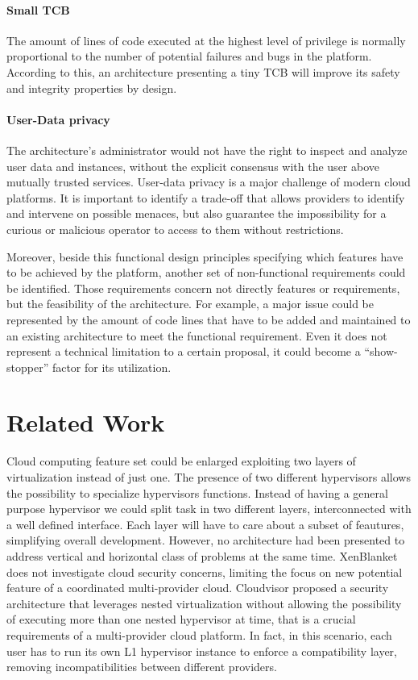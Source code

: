 \documentclass{acm_proc_article-sp} %
\begin{document}
\paragraph{Small TCB} The amount of lines of code executed at the highest level of privilege is normally proportional to the number of potential failures and bugs in the platform. According to this, an architecture presenting a tiny TCB will improve its safety and integrity properties by design.
\paragraph{User-Data privacy} The architecture's administrator would not have the right to inspect and analyze user data and instances, without the explicit consensus with the user above mutually trusted services. User-data privacy is a major challenge of modern cloud platforms. It is important to identify a trade-off that allows providers to identify and intervene on possible menaces, but also guarantee the impossibility for a curious or malicious operator to access to them without restrictions.

Moreover, beside this functional design principles specifying which features have to be achieved by the platform, another set of non-functional requirements could be identified. Those requirements concern not directly features or requirements, but the feasibility of the architecture. For example, a major issue could be represented by the amount of code lines that have to be added and maintained to an existing architecture to meet the functional requirement. Even it does not represent a technical limitation to a certain proposal, it could become a ``show-stopper'' factor for its utilization.


\section{Related Work}
Cloud computing feature set could be enlarged exploiting two layers of virtualization instead of just one. The presence of two different hypervisors allows the possibility to specialize hypervisors functions. Instead of having a general purpose hypervisor we could split task in two different layers, interconnected with a well defined interface.
Each layer will have to care about a subset of feautures, simplifying overall development.
However, no architecture had been presented to address vertical and horizontal class of problems at the same time. XenBlanket does not investigate cloud security concerns, limiting the focus on new potential feature of a coordinated multi-provider cloud. Cloudvisor proposed a security architecture that leverages nested virtualization without allowing the possibility of executing more than one nested hypervisor at time, that is a crucial requirements of a multi-provider cloud platform. In fact, in this scenario, each user has to run its own L1 hypervisor instance to enforce a compatibility layer, removing incompatibilities between different providers.
\end{document}
